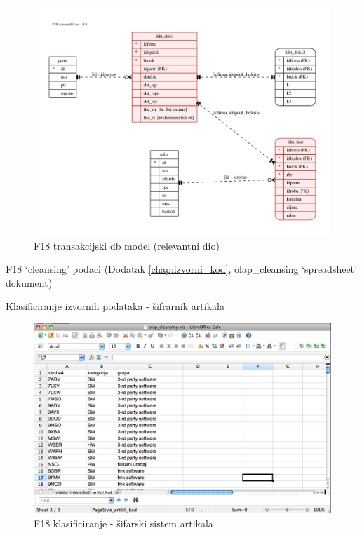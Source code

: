 \documentclass[times, utf8, seminar]{fit}
\begin{document}
\begin{figure}[H]
\centering
\includegraphics[width=15cm]{img/F18_db.pdf}
\caption{F18 transakcijski db model (relevantni dio)}
\end{figure}


F18 `cleansing' podaci  (Dodatak \ref{chap:izvorni_kod}, olap\_cleansing `spreadsheet' dokument)

Klasificiranje izvornih podataka - šifrarnik artikala

\begin{figure}[H]
\centering
\includegraphics[width=15cm]{img/clean_artikli.png}
\caption{F18 klasificiranje - šifarski sistem artikala}
\end{figure}
\end{document}
